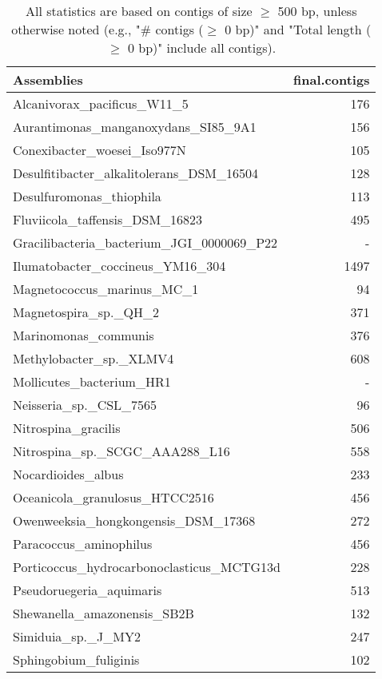 \documentclass[12pt,a4paper]{article}
\begin{document}
\begin{table}[ht]
\begin{center}
\caption{All statistics are based on contigs of size $\geq$ 500 bp, unless otherwise noted (e.g., "\# contigs ($\geq$ 0 bp)" and "Total length ($\geq$ 0 bp)" include all contigs).}
\begin{tabular}{|l*{1}{|r}|}
\hline
Assemblies & final.contigs \\ \hline
Alcanivorax\_pacificus\_W11\_5 & 176 \\ \hline
Aurantimonas\_manganoxydans\_SI85\_9A1 & 156 \\ \hline
Conexibacter\_woesei\_Iso977N & 105 \\ \hline
Desulfitibacter\_alkalitolerans\_DSM\_16504 & 128 \\ \hline
Desulfuromonas\_thiophila & 113 \\ \hline
Fluviicola\_taffensis\_DSM\_16823 & 495 \\ \hline
Gracilibacteria\_bacterium\_JGI\_0000069\_P22 & - \\ \hline
Ilumatobacter\_coccineus\_YM16\_304 & 1497 \\ \hline
Magnetococcus\_marinus\_MC\_1 & 94 \\ \hline
Magnetospira\_sp.\_QH\_2 & 371 \\ \hline
Marinomonas\_communis & 376 \\ \hline
Methylobacter\_sp.\_XLMV4 & 608 \\ \hline
Mollicutes\_bacterium\_HR1 & - \\ \hline
Neisseria\_sp.\_CSL\_7565 & 96 \\ \hline
Nitrospina\_gracilis & 506 \\ \hline
Nitrospina\_sp.\_SCGC\_AAA288\_L16 & 558 \\ \hline
Nocardioides\_albus & 233 \\ \hline
Oceanicola\_granulosus\_HTCC2516 & 456 \\ \hline
Owenweeksia\_hongkongensis\_DSM\_17368 & 272 \\ \hline
Paracoccus\_aminophilus & 456 \\ \hline
Porticoccus\_hydrocarbonoclasticus\_MCTG13d & 228 \\ \hline
Pseudoruegeria\_aquimaris & 513 \\ \hline
Shewanella\_amazonensis\_SB2B & 132 \\ \hline
Simiduia\_sp.\_J\_MY2 & 247 \\ \hline
Sphingobium\_fuliginis & 102 \\ \hline

\end{tabular}
\end{center}
\end{table}
\end{document}
